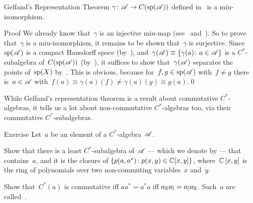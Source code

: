 \documentclass[main]{subfiles}
\begin{document}
\begin{parsec}
\begin{point}[gelfand]{Gelfand's Representation Theorem}
 $\gamma\colon \mathscr{A}\to C(\mathrm{sp}(\mathscr{A}))$
defined in~
is a miu-isomorphism.
\begin{point}{Proof}%
We already know that~$\gamma$ is an injective miu-map
(see~ 
and~).
So to prove that~$\gamma$ is a miu-isomorphism,
it remains to be shown that~$\gamma$ is surjective.
Since~$\mathrm{sp}(\mathscr{A})$ is a compact Hausdorff space 
(by~),
and~$\gamma(\mathscr{A})\equiv \{\gamma(a)\colon a\in \mathscr{A}\}$
is a $C^*$-subalgebra of~$C(\mathrm{sp}(\mathscr{A}))$
(by~),
it suffices to show that~$\gamma(\mathscr{A})$
separates the points of~$\mathrm{sp}(X)$
by~.
This is obvious,
because
for~$f,g\in \mathrm{sp}(\mathscr{A})$ with~$f\neq g$
there is~$a\in \mathscr{A}$ with~$f(a)\equiv \gamma(a)(f)
\neq \gamma(a)(g)\equiv g(a)$.\qed
\end{point}
\end{point}
\end{parsec}
\begin{parsec}%
\begin{point}%
While Gelfand's representation theorem
is a result about commutative $C^*$-algebras,
it tells us a lot about non-commutative $C^*$-algebras too,
via their commutative $C^*$-subalgebras.
\end{point}
\begin{point}{Exercise}%
Let~$a$ be an element of a $C^*$-algebra~$\mathscr{A}$.

Show that there is a least $C^*$-subalgebra of~$\mathscr{A}$
--- which we denote by  --- 
that contains~$a$,
and it is the closure of $\{p(a,a^*)\colon p(x,y)\in \mathbb{C}[x,y]\}$,
where~$\mathbb{C}\left[x,y\right]$ is the
ring of polynomials over two non-commuting
variables~$x$ and~$y$.

Show that~$C^*(a)$ is commutative
iff $aa^*=a^*a$ iff $a_{\mathbb{R}}a_{\mathbb{I}}=a_{\mathbb{I}}a_{\mathbb{R}}$.
Such~$a$ are called~.

\end{point}
\end{parsec}
\end{document}
